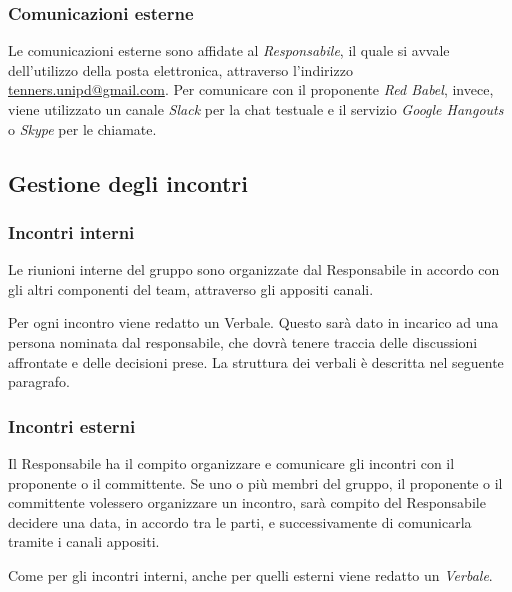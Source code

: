    		\subsubsection{Comunicazioni esterne}
   		Le comunicazioni esterne sono affidate al \textit{Responsabile}, il quale si avvale dell'utilizzo della posta elettronica, attraverso l'indirizzo \href{mailto:tenners.unipd@gmail.com}{tenners.unipd@gmail.com}.
   		Per comunicare con il proponente \textit{Red Babel}, invece, viene utilizzato un canale \textit{Slack\glo} per la chat testuale e il servizio \textit{Google Hangouts\glos} o \textit{Skype\glo} per le chiamate. 
   		
   	\subsection{Gestione degli incontri}
   		\subsubsection{Incontri interni}
   		Le riunioni interne del gruppo sono organizzate dal Responsabile in accordo con gli altri componenti del team, attraverso gli appositi canali.
   		
   		\noindent Per ogni incontro viene redatto un Verbale. Questo sarà dato in incarico ad una persona nominata dal responsabile, che dovrà tenere traccia delle discussioni affrontate e delle decisioni prese. La struttura dei verbali è descritta nel seguente paragrafo.
   		
   		\subsubsection{Incontri esterni}
   		Il Responsabile ha il compito organizzare e comunicare gli incontri con il proponente o il committente. Se uno o più membri del gruppo, il proponente o il committente volessero organizzare un incontro, sarà compito del Responsabile decidere una data, in accordo tra le parti, e successivamente di comunicarla tramite i canali appositi.
   		
   		\noindent Come per gli incontri interni, anche per quelli esterni viene redatto un \textit{Verbale}.
